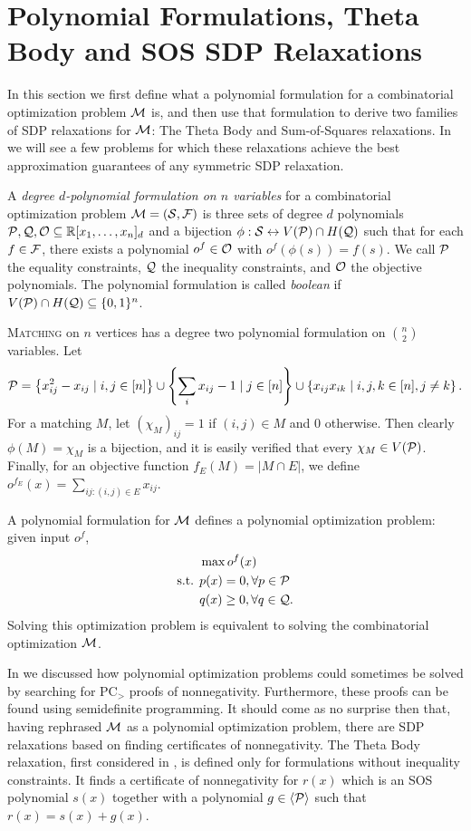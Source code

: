 \section{Polynomial Formulations, Theta Body and SOS SDP Relaxations}\label{sec:polyforms}
In this section we first define what a polynomial formulation for a combinatorial optimization problem $\mathcal M$ is, and then use that formulation to derive two families of SDP relaxations for $\mathcal M$: The Theta Body and Sum-of-Squares relaxations. In  we will see a few problems for which these relaxations achieve the best approximation guarantees of any symmetric SDP relaxation. 
\begin{definition}
A \emph{degree $d$-polynomial formulation on $n$ variables} for a combinatorial optimization problem $\mathcal M = (\mathcal S, \mathcal F)$ is three sets of degree $d$ polynomials $\mathcal P,\mathcal Q,\mathcal O \subseteq \mathbb R[x_1,\dots,x_n]_d$ and a bijection $\phi: \mathcal S \leftrightarrow V(\mathcal P) \cap H(\mathcal Q)$ such that for each $f \in \mathcal F$, there exists a polynomial $o^f \in \mathcal O$ with $o^f(\phi(s)) = f(s)$. We call $\mathcal P$ the equality constraints, $\mathcal Q$ the inequality constraints, and $\mathcal O$ the objective polynomials. The polynomial formulation is called \emph{boolean} if $V(\mathcal P) \cap H(\mathcal Q) \subseteq \{0,1\}^n$. 
\end{definition}
\begin{example}
\textsc{Matching} on $n$ vertices has a degree two polynomial formulation on $\binom{n}{2}$ variables. Let 
\[\mathcal P = \left\{x_{ij}^2 - x_{ij} \mid i,j \in [n]\right\} \cup \left\{\sum_i x_{ij} - 1 \mid j \in [n]\right\} \cup \left\{x_{ij}x_{ik} \mid i,j,k \in [n], j\neq k\right\}.\] 
For a matching $M$, let $(\chi_M)_{ij} = 1$ if $(i,j) \in M$ and $0$ otherwise. Then clearly $\phi(M) = \chi_M$ is a bijection, and it is easily verified that every $\chi_M \in V(\mathcal P)$. Finally, for an objective function $f_E(M) = |M \cap E|$, we define $o^{f_E}(x) = \sum_{ij: (i,j) \in E} x_{ij}$. 
\end{example}
A polynomial formulation for $\mathcal M$ defines a polynomial optimization problem: given input $o^f$, 
\begin{align*}
&\max o^f(x) \\
\text{s.t. } &p(x) = 0, \forall p \in \mathcal P \\
&q(x) \geq 0, \forall q \in \mathcal Q.
\end{align*} 
Solving this optimization problem is equivalent to solving the combinatorial optimization $\mathcal M$. 

In  we discussed how polynomial optimization problems could sometimes be solved by searching for PC$_>$ proofs of nonnegativity. Furthermore, these proofs can be found using semidefinite programming. It should come as no surprise then that, having rephrased $\mathcal M$ as a polynomial optimization problem, there are SDP relaxations based on finding certificates of nonnegativity. The Theta Body relaxation, first considered in \cite{GPT10}, is defined only for formulations without inequality constraints. It finds a certificate of nonnegativity for $r(x)$ which is an SOS polynomial $s(x)$ together with a polynomial $g \in \langle \mathcal P \rangle$ such that $r(x) = s(x) + g(x)$. 

